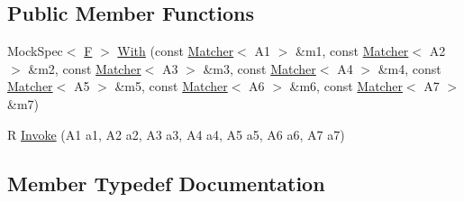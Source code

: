 \subsection*{Public Member Functions}
\begin{DoxyCompactItemize}
\item 
Mock\+Spec$<$ \mbox{\hyperlink{classtesting_1_1internal_1_1_function_mocker_3_01_r_07_a1_00_01_a2_00_01_a3_00_01_a4_00_01_a5_00_01_a6_00_01_a7_08_4_a2ea0e33d9cc0d1f57d58b4aee98c117c}{F}} $>$ \mbox{\hyperlink{classtesting_1_1internal_1_1_function_mocker_3_01_r_07_a1_00_01_a2_00_01_a3_00_01_a4_00_01_a5_00_01_a6_00_01_a7_08_4_a867b7a16d36bb314318265e1f4dbaf92}{With}} (const \mbox{\hyperlink{classtesting_1_1_matcher}{Matcher}}$<$ A1 $>$ \&m1, const \mbox{\hyperlink{classtesting_1_1_matcher}{Matcher}}$<$ A2 $>$ \&m2, const \mbox{\hyperlink{classtesting_1_1_matcher}{Matcher}}$<$ A3 $>$ \&m3, const \mbox{\hyperlink{classtesting_1_1_matcher}{Matcher}}$<$ A4 $>$ \&m4, const \mbox{\hyperlink{classtesting_1_1_matcher}{Matcher}}$<$ A5 $>$ \&m5, const \mbox{\hyperlink{classtesting_1_1_matcher}{Matcher}}$<$ A6 $>$ \&m6, const \mbox{\hyperlink{classtesting_1_1_matcher}{Matcher}}$<$ A7 $>$ \&m7)
\item 
R \mbox{\hyperlink{classtesting_1_1internal_1_1_function_mocker_3_01_r_07_a1_00_01_a2_00_01_a3_00_01_a4_00_01_a5_00_01_a6_00_01_a7_08_4_a9088342f6d93448dba290e565c006979}{Invoke}} (A1 a1, A2 a2, A3 a3, A4 a4, A5 a5, A6 a6, A7 a7)
\end{DoxyCompactItemize}


\subsection{Member Typedef Documentation}
\mbox{\label{classtesting_1_1internal_1_1_function_mocker_3_01_r_07_a1_00_01_a2_00_01_a3_00_01_a4_00_01_a5_00_01_a6_00_01_a7_08_4_a313911b9c80b57c8c25f0ad5ef2d0bdc}} 
